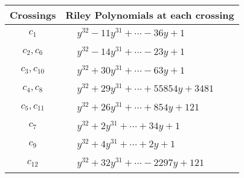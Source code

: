\documentclass[1p]{elsarticle_modified}
\theoremstyle{definition}
\begin{document}
\begin{tabular}{m{50pt}|m{274pt}}
Crossings & \hspace{64pt}Riley Polynomials at each crossing \\
\hline $$\begin{aligned}c_{1}\end{aligned}$$&$\begin{aligned}
&y^{32}-11 y^{31}+\cdots-36 y+1
\end{aligned}$\\
\hline $$\begin{aligned}c_{2},c_{6}\end{aligned}$$&$\begin{aligned}
&y^{32}-14 y^{31}+\cdots-23 y+1
\end{aligned}$\\
\hline $$\begin{aligned}c_{3},c_{10}\end{aligned}$$&$\begin{aligned}
&y^{32}+30 y^{31}+\cdots-63 y+1
\end{aligned}$\\
\hline $$\begin{aligned}c_{4},c_{8}\end{aligned}$$&$\begin{aligned}
&y^{32}+29 y^{31}+\cdots+55854 y+3481
\end{aligned}$\\
\hline $$\begin{aligned}c_{5},c_{11}\end{aligned}$$&$\begin{aligned}
&y^{32}+26 y^{31}+\cdots+854 y+121
\end{aligned}$\\
\hline $$\begin{aligned}c_{7}\end{aligned}$$&$\begin{aligned}
&y^{32}+2 y^{31}+\cdots+34 y+1
\end{aligned}$\\
\hline $$\begin{aligned}c_{9}\end{aligned}$$&$\begin{aligned}
&y^{32}+4 y^{31}+\cdots+2 y+1
\end{aligned}$\\
\hline $$\begin{aligned}c_{12}\end{aligned}$$&$\begin{aligned}
&y^{32}+32 y^{31}+\cdots-2297 y+121
\end{aligned}$\\
\hline
\end{tabular}\\~\\
\end{document}
